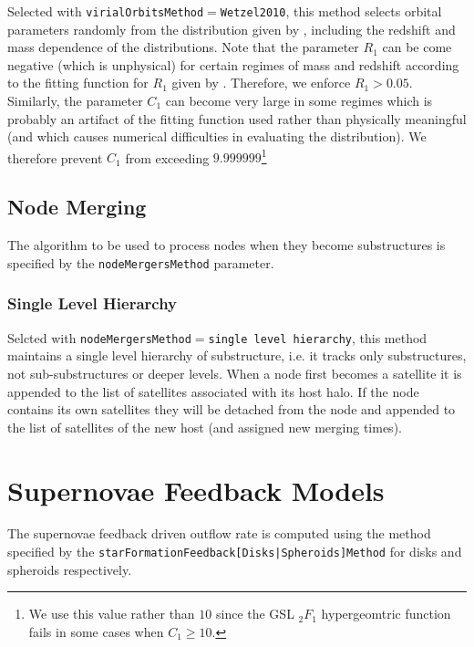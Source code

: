 Selected with {\tt virialOrbitsMethod}$=${\tt Wetzel2010}, this method selects orbital parameters randomly from the distribution given by \cite{wetzel_orbits_2010}, including the redshift and mass dependence of the distributions. Note that the parameter $R_1$ can be come negative (which is unphysical) for certain regimes of mass and redshift according to the fitting function for $R_1$ given by \cite{wetzel_orbits_2010}. Therefore, we enforce $R_1>0.05$. Similarly, the parameter $C_1$ can become very large in some regimes which is probably an artifact of the fitting function used rather than physically meaningful (and which causes numerical difficulties in evaluating the distribution). We therefore prevent $C_1$ from exceeding $9.999999$\footnote{We use this value rather than $10$ since the GSL $_2F_1$ hypergeomtric function fails in some cases when $C_1\ge 10$.}

\subsection{Node Merging}

The algorithm to be used to process nodes when they become substructures is specified by the {\tt nodeMergersMethod} parameter.

\subsubsection{Single Level Hierarchy}

Selcted with {\tt nodeMergersMethod}$=${\tt single level hierarchy}, this method maintains a single level hierarchy of substructure, i.e. it tracks only substructures, not sub-substructures or deeper levels. When a node first becomes a satellite it is appended to the list of satellites associated with its host halo. If the node contains its own satellites they will be detached from the node and appended to the list of satellites of the new host (and assigned new merging times).

\section{Supernovae Feedback Models}\label{sec:sneFeedback}

The supernovae feedback driven outflow rate is computed using the method specified by the {\tt starFormationFeedback[Disks|Spheroids]Method} for disks and spheroids respectively.

